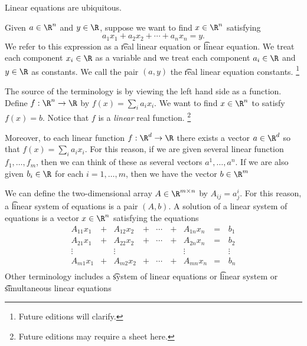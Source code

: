 
Linear equations are ubiquitous.


Given $a \in \R^n$ and $y \in \R$, suppose we want to find $x \in \R^n$ satisfying
  \[
a_1x_1 + a_2x_2 + \cdots + a_nx_n = y.
  \]
We refer to this expression as a \t{real linear equation} or \t{linear equation}.
We treat each component $x_i \in \R$ as a variable and we treat each component $a_i \in \R$ and $y \in \R$ as constants.
We call the pair $(a, y)$ the \t{real linear equation constants}.
  \ifhmode\unskip\fi\footnote{
Future editions will clarify.
  }

The source of the terminology  is by viewing the left hand side as a function.
Define $f: \R^n \to \R$ by $f(x) = \sum_{i}a_ix_i$.
We want to find $x \in \R^n$ to satisfy $f(x) = b$.
Notice that $f$ is a \textit{linear} real function.
  \ifhmode\unskip\fi\footnote{
Future editions may require a sheet here.
  }

Moreover, to each linear function $f: \R^d \to \R$ there exists a vector $a \in \R^d$ so that $f(x) = \sum_{i} a_ix_i$.
For this reason, if we are given several linear function $f_1, \dots, f_m$, then we can think of these as several vectors $a^1, \dots, a^n$.
If we are also given $b_i \in \R$ for each $i = 1, \dots, m$, then we have the vector $b \in \R^m$

We can define the two-dimensional array $A \in \R^{m \times n}$ by $A_{ij} = a^{i}_j$.
For this reason, a \t{linear system of equations} is a pair $(A, b)$.
A solution of a linear system of equations is a vector $x \in \R^n$ satisfying the equations
  \[
\begin{aligned}
A_{11}x_1 & + & A_{12}x_2 & + & \cdots \, & + & A_{1n}x_n & = \, & b_1 \\
A_{21}x_1 & + & A_{22}x_2 & + & \cdots & + & A_{2n}x_n & = & b_2 \\
\vdots & & \vdots & & & & \vdots & & \vdots \\
A_{m1}x_1 & + & A_{m2}x_2 & + & \cdots & + & A_{mn}x_n & = & b_n \\
\end{aligned}
  \]
Other terminology includes a \t{system of linear equations} or \t{linear system} or \t{simultaneous linear equations}
